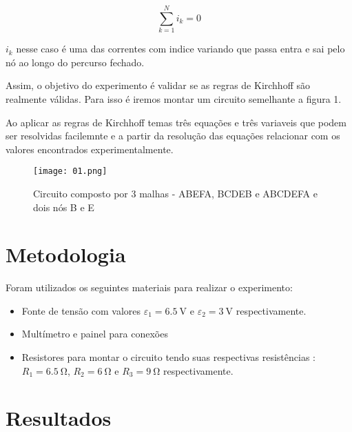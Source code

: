 \documentclass[14pt,twocolumn ]{article}
\begin{document}
\begin{equation}
\label{eq:resist}
     \sum_{k=1}^{N} i_{k}= 0 
\end{equation}

$i_k$ nesse caso é uma das correntes com indice variando que passa entra e sai pelo nó ao longo do percurso fechado.  


Assim, o objetivo do experimento é validar se as regras de Kirchhoff são realmente válidas. Para isso é iremos montar um circuito semelhante a figura 1.

Ao aplicar as regras de Kirchhoff temas três equações e três variaveis que podem ser resolvidas facilemnte e a partir da resolução das equações relacionar com os valores encontrados experimentalmente.





    
\begin{figure}
     
      \texttt{[image: 01.png]}
    \caption{Circuito composto por 3 malhas - ABEFA, BCDEB e ABCDEFA e dois nós B e E}
    \label{fig:my_label}
\end{figure}





\section{Metodologia}


Foram utilizados os seguintes materiais para realizar o experimento:

\begin{itemize}
\item Fonte de tensão com valores $\varepsilon_{1} = \SI{6.5}{\volt}$ e $\varepsilon_{2} = \SI{3}{\volt}$ respectivamente.
\item Multímetro e painel para conexões
\item Resistores para montar o circuito tendo suas respectivas resistências : $R_1 = \SI{6.5}{\ohm}$, $R_2= \SI{6}{\ohm} $ e $R_3 = \SI{9}{\ohm}$ respectivamente. 
	\end{itemize}





\section{Resultados}
\end{document}
